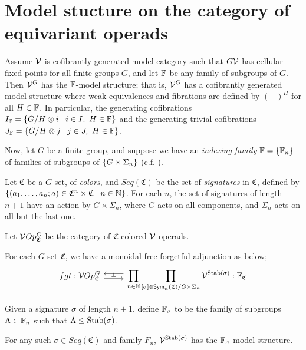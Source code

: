 \documentclass[psamsfonts,onesided,10pt,letterpaper]{amsart}%
\renewcommand{\C}{\ensuremath{\mathfrak{C}}}
\newcommand{\FF}{\ensuremath{\mathbb{F}}}
\newcommand{\N}{\mathbb N}
\begin{document}
\newpage
\section{Model stucture on the category of equivariant operads}

\begin{proposition}
  Assume $\mathcal V$ is cofibrantly generated model category such that $G\mathcal V$ has cellular fixed points for all finite groups $G$, and let $\mathbb{F}$ be any family of subgroups of $G$. Then $\mathcal V^G$ has the $\mathbb{F}$-model structure; that is, $\mathcal V^G$ has a cofibrantly generated model structure where weak equivalences and fibrations are defined by $(-)^H$ for all $H\in \mathbb{F}$. In particular, the generating cofibrations $I_{\mathbb{F}} = \left\{ G/H\otimes i \;|\; i\in I,\ H\in \mathbb{F}\right\}$ and the generating trivial cofibrations $J_{\mathbb{F}} = \left\{ G/H\otimes j \;|\; j\in J,\ H\in \mathbb{F}\right\}$. 
\end{proposition}

Now, let $G$ be a finite group, and suppose we have an {\em indexing family} $\mathbb{F} = \left\{\mathbb{F}_n\right\}$ of families of subgroups of $\left\{G\times \Sigma_n\right\}$ (c.f. \cite{BH15}). 

Let $\C$ be a $G$-set, of {\em colors}, and $Seq(\C)$ be the set of {\em signatures} in $\C$, defined by
$\sets{
  (a_1,\ldots, a_n; a)\in \C^n\times\C
}
{n\in\mathbb{N}}$.
For each $n$, the set of signatures of length $n+1$ have an action by $G\times \Sigma_n$, where $G$ acts on all components, and $\Sigma_n$ acts on all but the last one. 


\begin{definition}
  Let $\V Op^G_\C$ be the category of $\C$-colored $\mathcal V$-operads.
\end{definition}

\begin{lemma}
  For each $G$-set $\C$, we have a monoidal free-forgetful adjunction as below;
\[
\begin{tikzcd}
      fgt: \V Op^G_\C \arrow[r,yshift=-.3em, "\perp"]
      &
      \displaystyle\prod_{n\in\N}\displaystyle\prod_{[\sigma]\in\Sym_n(\C)/G\times\Sigma_n}\V^{\Stab(\sigma)}
      \arrow[l, yshift=.3em]
      : \FF_\C
\end{tikzcd}
\]
\end{lemma}

Given a signature $\sigma$ of length $n+1$, define $\mathbb{F}_\sigma$ to be the family of subgroups $\Lambda\in \mathbb{F}_n$ such that $\Lambda\leq \mathrm{Stab}(\sigma)$.
\begin{corollary}
  For any such $\sigma\in Seq(\C)$ and family $F_n$, $\mathcal V^{\mathrm{Stab}(\sigma)}$ has the $\mathbb{F}_\sigma$-model structure.
\end{corollary}
\end{document}
